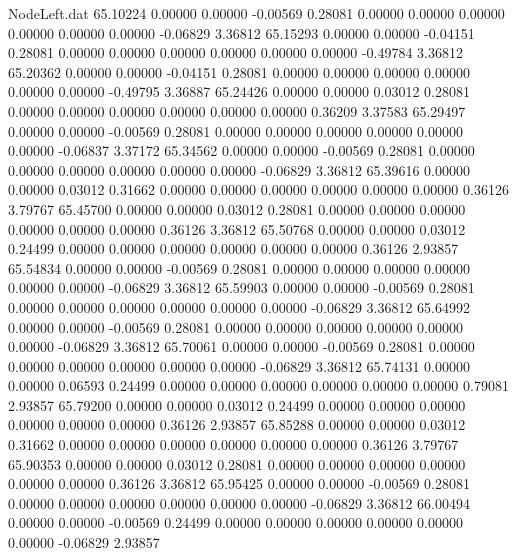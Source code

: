 \begin{filecontents}{NodeLeft.dat}
  65.10224    0.00000    0.00000    -0.00569    0.28081    0.00000    0.00000    0.00000    0.00000    0.00000    0.00000   -0.06829    3.36812
  65.15293    0.00000    0.00000    -0.04151    0.28081    0.00000    0.00000    0.00000    0.00000    0.00000    0.00000   -0.49784    3.36812
  65.20362    0.00000    0.00000    -0.04151    0.28081    0.00000    0.00000    0.00000    0.00000    0.00000    0.00000   -0.49795    3.36887
  65.24426    0.00000    0.00000     0.03012    0.28081    0.00000    0.00000    0.00000    0.00000    0.00000    0.00000    0.36209    3.37583
  65.29497    0.00000    0.00000    -0.00569    0.28081    0.00000    0.00000    0.00000    0.00000    0.00000    0.00000   -0.06837    3.37172
  65.34562    0.00000    0.00000    -0.00569    0.28081    0.00000    0.00000    0.00000    0.00000    0.00000    0.00000   -0.06829    3.36812
  65.39616    0.00000    0.00000     0.03012    0.31662    0.00000    0.00000    0.00000    0.00000    0.00000    0.00000    0.36126    3.79767
  65.45700    0.00000    0.00000     0.03012    0.28081    0.00000    0.00000    0.00000    0.00000    0.00000    0.00000    0.36126    3.36812
  65.50768    0.00000    0.00000     0.03012    0.24499    0.00000    0.00000    0.00000    0.00000    0.00000    0.00000    0.36126    2.93857
  65.54834    0.00000    0.00000    -0.00569    0.28081    0.00000    0.00000    0.00000    0.00000    0.00000    0.00000   -0.06829    3.36812
  65.59903    0.00000    0.00000    -0.00569    0.28081    0.00000    0.00000    0.00000    0.00000    0.00000    0.00000   -0.06829    3.36812
  65.64992    0.00000    0.00000    -0.00569    0.28081    0.00000    0.00000    0.00000    0.00000    0.00000    0.00000   -0.06829    3.36812
  65.70061    0.00000    0.00000    -0.00569    0.28081    0.00000    0.00000    0.00000    0.00000    0.00000    0.00000   -0.06829    3.36812
  65.74131    0.00000    0.00000     0.06593    0.24499    0.00000    0.00000    0.00000    0.00000    0.00000    0.00000    0.79081    2.93857
  65.79200    0.00000    0.00000     0.03012    0.24499    0.00000    0.00000    0.00000    0.00000    0.00000    0.00000    0.36126    2.93857
  65.85288    0.00000    0.00000     0.03012    0.31662    0.00000    0.00000    0.00000    0.00000    0.00000    0.00000    0.36126    3.79767
  65.90353    0.00000    0.00000     0.03012    0.28081    0.00000    0.00000    0.00000    0.00000    0.00000    0.00000    0.36126    3.36812
  65.95425    0.00000    0.00000    -0.00569    0.28081    0.00000    0.00000    0.00000    0.00000    0.00000    0.00000   -0.06829    3.36812
  66.00494    0.00000    0.00000    -0.00569    0.24499    0.00000    0.00000    0.00000    0.00000    0.00000    0.00000   -0.06829    2.93857

\end{filecontents}
